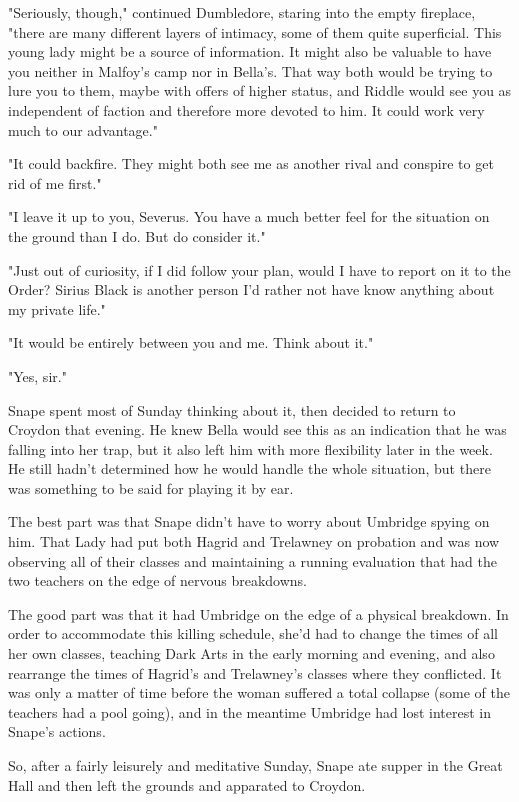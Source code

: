 \documentclass[a4paper,11pt]{article}
\begin{document}
"Seriously, though," continued Dumbledore, staring into the empty fireplace, "there are many different layers of intimacy, some of them quite superficial. This young lady might be a source of information. It might also be valuable to have you neither in Malfoy's camp nor in Bella's. That way both would be trying to lure you to them, maybe with offers of higher status, and Riddle would see you as independent of faction and therefore more devoted to him. It could work very much to our advantage."

"It could backfire. They might both see me as another rival and conspire to get rid of me first."

"I leave it up to you, Severus. You have a much better feel for the situation on the ground than I do. But do consider it."

"Just out of curiosity, if I did follow your plan, would I have to report on it to the Order? Sirius Black is another person I'd rather not have know anything about my private life."

"It would be entirely between you and me. Think about it."

"Yes, sir."

Snape spent most of Sunday thinking about it, then decided to return to Croydon that evening. He knew Bella would see this as an indication that he was falling into her trap, but it also left him with more flexibility later in the week. He still hadn't determined how he would handle the whole situation, but there was something to be said for playing it by ear.

The best part was that Snape didn't have to worry about Umbridge spying on him. That Lady had put both Hagrid and Trelawney on probation and was now observing all of their classes and maintaining a running evaluation that had the two teachers on the edge of nervous breakdowns.

The good part was that it had Umbridge on the edge of a physical breakdown. In order to accommodate this killing schedule, she'd had to change the times of all her own classes, teaching Dark Arts in the early morning and evening, and also rearrange the times of Hagrid's and Trelawney's classes where they conflicted. It was only a matter of time before the woman suffered a total collapse (some of the teachers had a pool going), and in the meantime Umbridge had lost interest in Snape's actions.

So, after a fairly leisurely and meditative Sunday, Snape ate supper in the Great Hall and then left the grounds and apparated to Croydon.
\end{document}

